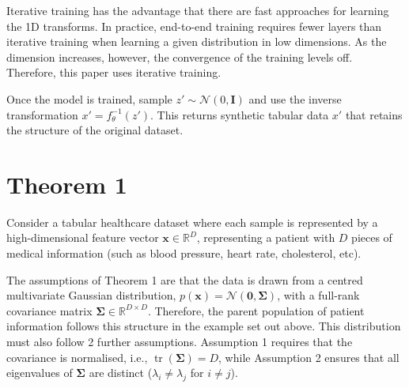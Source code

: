\documentclass[11pt]{report} %
\begin{document}
Iterative training has the advantage that there are fast approaches for learning the 1D transforms. In practice, end-to-end training requires fewer layers than
iterative training when learning a given distribution in low dimensions.\cite{meng2020gaussianization} As the dimension increases, however, the convergence of the training levels off. Therefore, this paper uses iterative training.

Once the model is trained, sample \( z' \sim \mathcal{N}(0, \mathbf{I}) \) and use the inverse transformation \( x' = f_\theta^{-1}(z') \).
This returns {synthetic tabular data} \( x' \) that retains the structure of the original dataset.

\section{Theorem 1}
Consider a tabular healthcare dataset where each sample is represented by a high-dimensional feature vector \( \mathbf{x} \in \mathbb{R}^D \), representing a patient with \( D\) pieces of medical information (such as blood pressure, heart rate, cholesterol, etc). %


The assumptions of Theorem 1 are that the data is drawn from a centred multivariate Gaussian distribution, \( p(\mathbf{x}) = \mathcal{N}(\mathbf{0}, \mathbf{\Sigma}) \), with a full-rank covariance matrix \( \mathbf{\Sigma} \in \mathbb{R}^{D \times D} \). Therefore, the parent population of patient information follows this structure in the example set out above.
This distribution must also follow 2 further assumptions. Assumption 1 requires that the covariance is normalised, i.e., \( \operatorname{tr} (\mathbf{\Sigma}) = D \), while Assumption 2 ensures that all eigenvalues of \( \mathbf{\Sigma} \) are distinct (\( \lambda_i \neq \lambda_j \) for \( i \neq j \)). 
\end{document}
